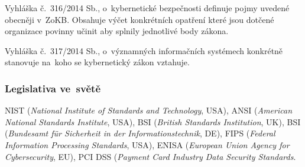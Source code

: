 Vyhláška č.~316/2014 Sb., o~kybernetické bezpečnosti definuje pojmy uvedené obecněji v~ZoKB.
Obsahuje výčet konkrétních opatření které jsou dotčené organizace povinny učinit aby splnily jednotlivé body zákona.

Vyhláška č.~317/2014 Sb., o~významných informačních systémech konkrétně stanovuje na~koho se kybernetický zákon vztahuje.


\subsubsection{Legislativa ve~světě}

NIST (\emph{National Institute of Standards and Technology}, USA),
ANSI (\emph{American National Standards Institute}, USA),
BSI (\emph{British Standards Institution}, UK),
BSI (\emph{Bundesamt für Sicherheit in der Informationstechnik}, DE),
FIPS (\emph{Federal Information Processing Standards}, USA),
ENISA (\emph{European Union Agency for Cybersecurity}, EU),
PCI DSS (\emph{Payment Card Industry Data Security Standards}.
